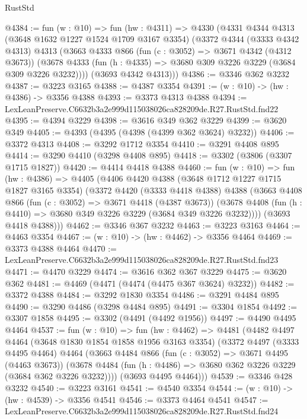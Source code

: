 \begin{lexlean}{RustStd}
\begin{coremodule}
@4384 := fun (w : @10) =>
  fun (hw : @4311) =>
  @4330
    (@4331
      @4344
      @4313
      (@3648 @1632 @1227 @1524 @1709 @3167 @3354)
      (@3372
        @4344
        (@3333 @4342 @4313)
        @4313
        (@3663
          @4333
          @866
          (fun (c : @3052) => @3671 @4342 (@4312 @3673))
          (@3678 @4333 (fun (h : @4335) => @3680 @309 @3226 @3229 (@3684 @309 @3226 @3232))))
        (@3693 @4342 @4313)))
@4386 := @3346 @362 @3232
@4387 := @3223 @3165
@4388 := @4387 @3354
@4391 := (w : @10) -> (hw : @4386) -> @3356 @4388
@4393 := @3373 @4313 @4388
@4394 := LexLeanPreserve.C6632b3a2e999d115038026ca828209de.R27.RustStd.fnd22
@4395 := @4394 @3229
@4398 := @3616 @349 @362 @3229
@4399 := @3620 @349
@4405 := @4393 (@4395 (@4398 (@4399 @362 @3624) @3232))
@4406 := @3372 @4313
@4408 := @3292 @1712 @3354
@4410 := @3291 @4408 @895
@4414 := @3290 @4410 (@3298 @4408 @895)
@4418 := @3302 (@3806 (@3307 @1715 @1827))
@4420 := @4414 @4418 @4388
@4460 := fun (w : @10) =>
  fun (hw : @4386) =>
  @4405
    (@4406
      @4420
      @4388
      (@3648 @1712 @1227 @1715 @1827 @3165 @3354)
      (@3372
        @4420
        (@3333 @4418 @4388)
        @4388
        (@3663
          @4408
          @866
          (fun (c : @3052) => @3671 @4418 (@4387 @3673))
          (@3678 @4408 (fun (h : @4410) => @3680 @349 @3226 @3229 (@3684 @349 @3226 @3232))))
        (@3693 @4418 @4388)))
@4462 := @3346 @367 @3232
@4463 := @3223 @3163
@4464 := @4463 @3354
@4467 := (w : @10) -> (hw : @4462) -> @3356 @4464
@4469 := @3373 @4388 @4464
@4470 := LexLeanPreserve.C6632b3a2e999d115038026ca828209de.R27.RustStd.fnd23
@4471 := @4470 @3229
@4474 := @3616 @362 @367 @3229
@4475 := @3620 @362
@4481 := @4469 (@4471 (@4474 (@4475 @367 @3624) @3232))
@4482 := @3372 @4388
@4484 := @3292 @1830 @3354
@4486 := @3291 @4484 @895
@4490 := @3290 @4486 (@3298 @4484 @895)
@4491 := @3304 @1854
@4492 := @3307 @1858
@4495 := @3302 (@4491 (@4492 @1956))
@4497 := @4490 @4495 @4464
@4537 := fun (w : @10) =>
  fun (hw : @4462) =>
  @4481
    (@4482
      @4497
      @4464
      (@3648 @1830 @1854 @1858 @1956 @3163 @3354)
      (@3372
        @4497
        (@3333 @4495 @4464)
        @4464
        (@3663
          @4484
          @866
          (fun (c : @3052) => @3671 @4495 (@4463 @3673))
          (@3678 @4484 (fun (h : @4486) => @3680 @362 @3226 @3229 (@3684 @362 @3226 @3232))))
        (@3693 @4495 @4464)))
@4539 := @3346 @428 @3232
@4540 := @3223 @3161
@4541 := @4540 @3354
@4544 := (w : @10) -> (hw : @4539) -> @3356 @4541
@4546 := @3373 @4464 @4541
@4547 := LexLeanPreserve.C6632b3a2e999d115038026ca828209de.R27.RustStd.fnd24

\end{coremodule}
\end{lexlean}
